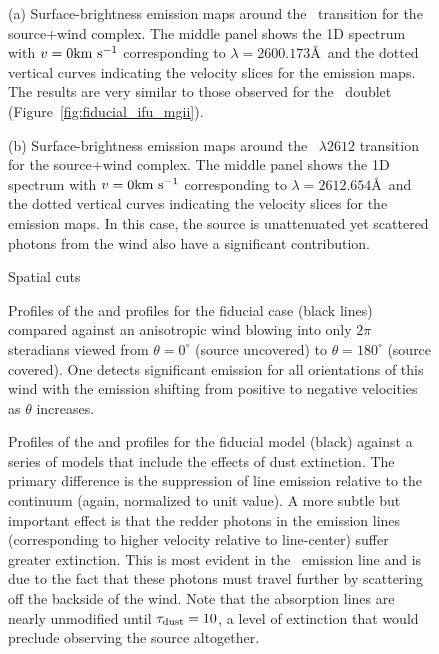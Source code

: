 \documentclass[12pt,preprint]{aastex}
\begin{document}
\begin{figure}
\caption{
(a) Surface-brightness emission maps around the \feiib\ transition for the
source+wind complex.  The middle panel shows the 1D spectrum with $v=0
{\rm km~s^{-1}}$ corresponding to $\lambda = 2600.173$\AA\ and the dotted vertical
curves indicating the velocity slices for the emission maps.  
The results are very similar to those observed for the \mgiid\ doublet
(Figure~\ref{fig:fiducial_ifu_mgii}).
}
\label{fig:fiducial_ifu_feii2600}
\end{figure}

\begin{figure*}
\caption{
(b) Surface-brightness emission maps around the ~$\lambda 2612$ transition for the
source+wind complex.  The middle panel shows the 1D spectrum with $v=0
{\rm km~s^{-1}}$ corresponding to $\lambda = 2612.654$\AA\ and the dotted vertical
curves indicating the velocity slices for the emission maps.  
In this case, the source is unattenuated yet scattered photons from
the wind also have a significant contribution. 
}
\label{fig:fiducial_ifu_feii2612}
\end{figure*}

\begin{figure}
\caption{
Spatial cuts
}
\label{fig:fiducial_cuts}
\end{figure}

\begin{figure}
\caption{
Profiles of the  and  profiles for the fiducial
case (black lines) compared against an anisotropic wind blowing into
only $2\pi$ steradians viewed from $\theta = 0^\circ$ (source
uncovered) to $\theta = 180^\circ$ (source covered).  One detects
significant emission for all orientations of this wind with the
emission shifting from positive to negative velocities as $\theta$
increases.  
}
\label{fig:anisotropic}
\end{figure}

\begin{figure}
\caption{
Profiles of the  and  profiles for the fiducial
model (black) against a series of models that include the effects of
dust extinction.  The primary difference is the suppression of line
emission relative to the continuum (again, normalized to unit value).
A more subtle but important effect is that the redder photons in the
emission lines (corresponding to higher velocity relative to
line-center) suffer greater extinction.  This is most evident in the
\feiic\ emission line and is due to the fact that these photons must
travel further by scattering off the backside of the wind.  Note that
the absorption lines are nearly unmodified until $\tau_{\rm dust} = 10$, a
level of extinction that would preclude observing the source
altogether.
}
\label{fig:dust}
\end{figure}
\end{document}
